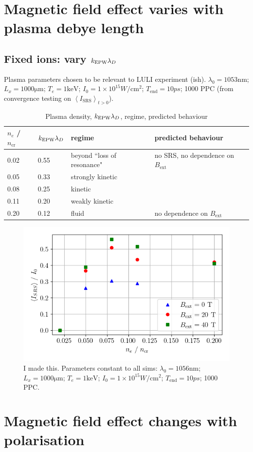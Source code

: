 \section{Magnetic field effect varies with plasma debye length}
\subsection{Fixed ions: vary $k_\mathrm{EPW}\lambda_D$}

Plasma parameters chosen to be relevant to LULI experiment (ish). $\lambda_0 = 1053 \si{\nano\metre}$; $L_x = 1000 \si{\micro\metre}$; $T_e = 1 \si{\kilo\electronvolt}$; $I_0 = 1\times 10^{15}\si{W/\cm^2}$; $T_{\mathrm{end}}=10 \si{ps}$; 1000 PPC (from convergence testing on $\left< I_{\mathrm{SRS}} \right>_{t>0}$).

\begin{table}[h]
\begin{center}

\begin{tabular}{|l|l|l|l|}
\hline
$n_e$ / $n_{\mathrm{cr}}$ & $k_\mathrm{EPW}\lambda_D$ & regime & predicted behaviour\\ \hline \hline
0.02 & 0.55 & beyond ``loss of resonance" & no SRS, no dependence on $B_{\mathrm{ext}}$  \\ \hline
0.05 & 0.33 & strongly kinetic &  \\ \hline
0.08 & 0.25 & kinetic &  \\ \hline
0.11 & 0.20 & weakly kinetic & \\ \hline
0.20 & 0.12 & fluid & no dependence on $B_{\mathrm{ext}}$\\ \hline

\end{tabular}

\end{center}
\caption{Plasma density, $k_\mathrm{EPW}\lambda_D$, regime, predicted behaviour}
\label{tab:predictions}
\end{table}

\begin{figure}[ht]
   \centering
    \includegraphics[width=0.9\columnwidth]{Chapters/C6_magSRS/kld_scan_SRS_scaling.png}
    \caption{I made this. Parameters constant to all sims: 
 $\lambda_0 = 1056 \si{\nano\metre}$; $L_x = 1000 \si{\micro\metre}$; $T_e = 1 \si{\kilo\electronvolt}$; $I_0 = 1\times 10^{15}\si{W/\cm^2}$; $T_{\mathrm{end}}=10 \si{ps}$; 1000 PPC.}
    \label{fig:SRS_EPOCH}
\end{figure}{}


\section{Magnetic field effect changes with polarisation}




